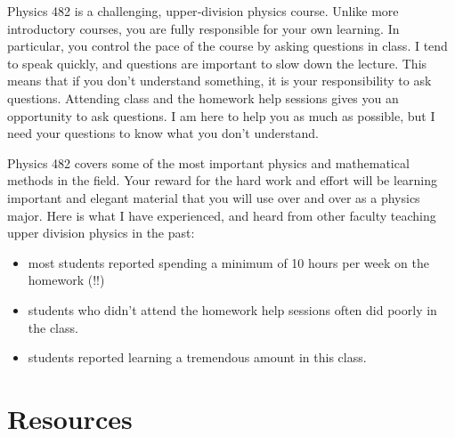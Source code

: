 \documentclass[letterpaper,10pt,english]{jupyterBook}
\begin{document}
\sphinxAtStartPar
Physics 482 is a challenging, upper‐division physics course. Unlike more
introductory courses, you are fully responsible for your own learning.
In particular, you control the pace of the course by asking questions in
class. I tend to speak quickly, and questions are important to slow down
the lecture. This means that if you don’t understand something, it is
your responsibility to ask questions. Attending class and the homework
help sessions gives you an opportunity to ask questions. I am here to
help you as much as possible, but I need your questions to know what you
don’t understand.

\sphinxAtStartPar
Physics 482 covers some of the most important physics and mathematical
methods in the field. Your reward for the hard work and effort will be
learning important and elegant material that you will use over and over
as a physics major. Here is what I have experienced, and heard from
other faculty teaching upper division physics in the past:
\begin{itemize}
\item {} 
\sphinxAtStartPar
most students reported spending a minimum of 10 hours per week on the
homework (!!)

\item {} 
\sphinxAtStartPar
students who didn’t attend the homework help sessions
often did poorly in the class.

\item {} 
\sphinxAtStartPar
students reported learning a tremendous amount in this class.

\end{itemize}

\sphinxAtStartPar
{}


\section{Resources}
\label{\detokenize{content/0_course/resources:resources}}\label{\detokenize{content/0_course/resources::doc}}
\end{document}
